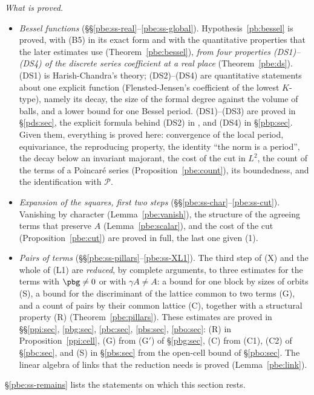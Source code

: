 \documentclass[10pt]{amsart}
\theoremstyle{definition}
\theoremstyle{remark}
\providecommand{\auP}{\mathcal P}
\begin{document}
\emph{What is proved.}
\begin{itemize}
\item[(1)] \emph{Bessel functions} (\S\S\ref{pbe:ss-real}--\ref{pbe:ss-global}).
Hypothesis~\ref{pb:bessel} is proved, with \textup{(B5)} in its exact form and with the
quantitative properties that the later estimates use (Theorem~\ref{pbe:bessel}), \emph{from four
properties \textup{(DS1)--(DS4)} of the discrete series coefficient at a real place}
(Theorem~\ref{pbe:ds}). \textup{(DS1)} is Harish-Chandra's theory; \textup{(DS2)}--\textup{(DS4)}
are quantitative statements about one explicit function (Flensted-Jensen's coefficient of the lowest
$K$-type), namely its decay, the size of the formal degree against the volume of balls, and a lower
bound for one Bessel period. \textup{(DS1)}--\textup{(DS3)} are proved in \S\ref{pds:sec}, the explicit
formula behind \textup{(DS2)} in {\cite[Theorem~3.17]{P49}}, and \textup{(DS4)} in \S\ref{pbp:sec}. Given
them, everything is proved here: convergence of the local period, equivariance, the reproducing
property, the identity ``the norm is a period'', the decay below an invariant majorant, the cost
of the cut in $L^2$, the count of the terms of a Poincar\'e series (Proposition~\ref{pbe:count}),
its boundedness, and the identification with $\auP$.
\item[(2)] \emph{Expansion of the squares, first two steps} (\S\S\ref{pbe:ss-char}--\ref{pbe:ss-cut}).
Vanishing by character (Lemma~\ref{pbe:vanish}), the structure of the agreeing terms that preserve
$A$ (Lemma~\ref{pbe:scalar}), and the cost of the cut (Proposition~\ref{pbe:cut}) are proved in
full, the last one given (1).
\item[(3)] \emph{Pairs of terms} (\S\S\ref{pbe:ss-pillars}--\ref{pbe:ss-XL1}).
The third step of \textup{(X)} and the whole of \textup{(L1)} are \emph{reduced}, by complete
arguments, to three estimates for the terms with $\pbg\ne0$ or with $\gamma A\ne A$: a bound for one
block by sizes of orbits \textup{(S)}, a bound for the discriminant of the lattice common to two
terms \textup{(G)}, and a count of pairs by their common lattice \textup{(C)}, together with a structural property \textup{(R)}
(Theorem~\ref{pbe:pillars}). These estimates are proved in \S\S\ref{ppi:sec}, \ref{pbg:sec},
\ref{pbc:sec}, \ref{pbs:sec}, \ref{pbo:sec}: (R) in Proposition~\ref{ppi:cell}, (G) from (G$'$) of
\S\ref{pbg:sec}, (C) from (C1), (C2) of \S\ref{pbc:sec}, and (S) in \S\ref{pbs:sec} from the open-cell
bound of \S\ref{pbo:sec}. The linear algebra
of links that the reduction needs is proved (Lemma~\ref{pbe:link}).
\end{itemize}
\S\ref{pbe:ss-remains} lists the statements on which this section rests.
\end{document}
